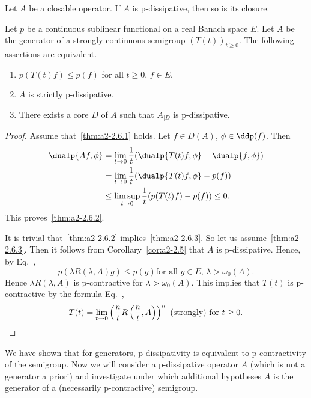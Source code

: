 \begin{corollary}\label{cor:a2-2.5}
Let $A$ be a closable operator.
If\/ $A$ is p-dissipative, then so is its closure.
\end{corollary}
\begin{theorem}\label{thm:a2-2.6}
Let $p$ be a continuous sublinear functional on a real Banach space $E$.
Let $A$ be the generator of a strongly continuous semigroup $(T(t))_{t\geq 0}$.
The following assertions are equivalent.
\begin{enumerate}[\upshape (a)]
\item \label{thm:a2-2.6.1}
$p(T(t)f) \leq p(f)$ for all $t \geq 0$, $f \in E$.

\item \label{thm:a2-2.6.2}
$A$ is strictly p-dissipative.
 
\item \label{thm:a2-2.6.3}
There exists a core $D$ of\/ $A$ such that $A_{\vert D}$ is p-dissipative.
\end{enumerate}
\end{theorem}
\begin{proof}
Assume that~\ref{thm:a2-2.6.1} holds.
Let $f \in D(A)$, $\phi \in \ddp(f)$.
Then 
\begin{align*}
	\dualp{Af,\phi} &= \lim_{t\to 0} \frac{1}{t} (\dualp{T(t)f,\phi} - \dualp{f,\phi}) \\
	&= \lim_{t\to 0} \frac{1}{t} (\dualp{T(t)f,\phi} - p(f)) \\
	&\leq \limsup_{t\to 0} \frac{1}{t} (p(T(t)f) - p(f)) \leq 0. 
\end{align*}
This proves~\ref{thm:a2-2.6.2}. 

It is trivial that~\ref{thm:a2-2.6.2} implies~\ref{thm:a2-2.6.3}.  
So let us assume~\ref{thm:a2-2.6.3}. 
Then it follows from Corollary~\ref{cor:a2-2.5}   that $A$ is p-dissipative.
Hence, by Eq.~,  
%
\[
	p(\lambda R(\lambda,A)g) \leq p(g) \text{for all $g \in E$, $\lambda > \omega_{0}(A)$}.
\]
%
Hence $\lambda R(\lambda,A)$ is p-contractive for $\lambda > \omega_{0}(A)$.
This implies that $T(t)$ is p-contractive by the formula Eq.~, 
\[
T(t) = \lim_{t\to 0} \left( \frac{n}{t} R\left( \frac{n}{t},A \right) \right)^{n} 
	\text{ (strongly) for } t \geq 0. \qedhere
\]
\end{proof}
We have shown that for generators, p-dissipativity is equivalent to p-contractivity of the semigroup.
Now we will consider a p-dissipative operator $A$ (which is not a generator a priori) and investigate under which additional hypotheses $A$ is the generator of a (necessarily p-contractive) semigroup.
